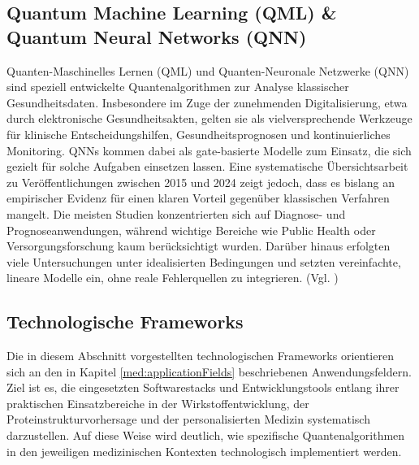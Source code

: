 \subsection{Quantum Machine Learning (QML) \& Quantum Neural Networks (QNN)}
Quanten-Maschinelles Lernen (QML) und Quanten-Neuronale Netzwerke (QNN) sind speziell entwickelte Quantenalgorithmen zur Analyse klassischer Gesundheitsdaten. Insbesondere im Zuge der zunehmenden Digitalisierung, etwa durch elektronische Gesundheitsakten, gelten sie als vielversprechende Werkzeuge für klinische Entscheidungshilfen, Gesundheitsprognosen und kontinuierliches Monitoring. QNNs kommen dabei als gate-basierte Modelle zum Einsatz, die sich gezielt für solche Aufgaben einsetzen lassen. Eine systematische Übersichtsarbeit zu Veröffentlichungen zwischen 2015 und 2024 zeigt jedoch, dass es bislang an empirischer Evidenz für einen klaren Vorteil gegenüber klassischen Verfahren mangelt. Die meisten Studien konzentrierten sich auf Diagnose- und Prognoseanwendungen, während wichtige Bereiche wie Public Health oder Versorgungsforschung kaum berücksichtigt wurden. Darüber hinaus erfolgten viele Untersuchungen unter idealisierten Bedingungen und setzten vereinfachte, lineare Modelle ein, ohne reale Fehlerquellen zu integrieren. (Vgl. \cite{gupta_systematic_2025})

\subsection{Technologische Frameworks}
Die in diesem Abschnitt vorgestellten technologischen Frameworks orientieren sich an den in Kapitel \ref{med:applicationFields} beschriebenen Anwendungsfeldern. Ziel ist es, die eingesetzten Softwarestacks und Entwicklungstools entlang ihrer praktischen Einsatzbereiche in der Wirkstoffentwicklung, der Proteinstrukturvorhersage und der personalisierten Medizin systematisch darzustellen. Auf diese Weise wird deutlich, wie spezifische Quantenalgorithmen in den jeweiligen medizinischen Kontexten technologisch implementiert werden.\\

